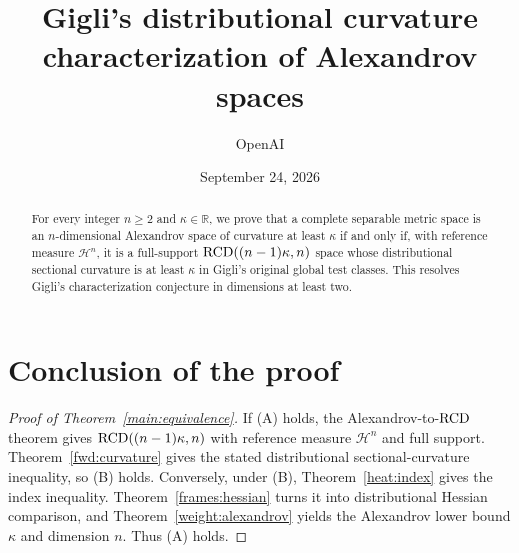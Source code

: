 \documentclass[11pt]{article}
\title{Gigli's distributional curvature\\characterization of Alexandrov spaces}
\author{OpenAI}
\date{September 24, 2026}
\begin{document}
\maketitle
\begin{abstract}
For every integer \(n\ge2\) and \(\kappa\in\mathbb R\), we prove that
a complete separable metric space is an \(n\)-dimensional Alexandrov
space of curvature at least \(\kappa\) if and only if, with reference
measure \(\mathcal H^n\), it is a full-support
\(\mathrm{RCD}((n-1)\kappa,n)\) space whose distributional sectional curvature
is at least \(\kappa\) in Gigli's original global test classes.
This resolves Gigli's characterization conjecture in dimensions at least two.
\end{abstract}
{\small\tableofcontents}
\clearpage






\section{Conclusion of the proof}
\label{sec:conclusion}
\begin{proof}[Proof of Theorem~\ref{main:equivalence}]
If \textup{(A)} holds, the Alexandrov-to-\(\mathrm{RCD}\) theorem gives
\(\mathrm{RCD}((n-1)\kappa,n)\) with reference measure \(\mathcal H^n\)
and full support. Theorem~\ref{fwd:curvature} gives the stated
distributional sectional-curvature inequality, so \textup{(B)} holds.
Conversely, under \textup{(B)}, Theorem~\ref{heat:index} gives the
index inequality. Theorem~\ref{frames:hessian} turns it into
distributional Hessian comparison, and
Theorem~\ref{weight:alexandrov} yields the Alexandrov lower bound
\(\kappa\) and dimension \(n\). Thus \textup{(A)} holds.
\end{proof}


\end{document}
